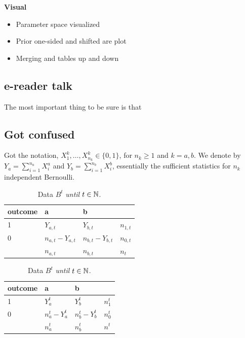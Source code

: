 \textbf{Visual}
\begin{itemize}
	\item Parameter space visualized
	\item Prior one-sided and shifted are plot
	\item Merging and tables up and down
\end{itemize}

\subsection*{e-reader talk}

The most important thing to be sure is that


\subsection*{Got confused}

Got the notation, $X_1^k, \ldots, X_{n_k}^k\in \{0,1\}$, for $n_k\geq 1$ and $k=a,b$. We denote by $Y_{a}=\sum_{i=1}^{n_a} X_i^a$ and $Y_{b}=\sum_{i=1}^{n_b} X_i^b$, essentially the sufficient statistics for $n_k$ independent Bernoulli.

\begin{table}[h]
	\centering
	\begin{minipage}{0.45\textwidth}
		\centering
		\begin{tabular}{llll}
			\toprule
			outcome & a                  & b                               \\
			\midrule
			1       & $Y_{a,t}$          & $Y_{b,t}$          & $n_{1,t} $ \\
			0       & $n_{a,t}- Y_{a,t}$ & $n_{b,t}- Y_{b,t}$ & $n_{0,t}$  \\
			        & $n_{a,t}$          & $n_{b,t}$          & $n_t$      \\
			\bottomrule
		\end{tabular}
		\caption{Data $B_t$ \emph{at} $t\in \mathbb{N}$.} \label{table:2x2_at_t}
	\end{minipage}
	\hfill
	\begin{minipage}{0.45\textwidth}
		\centering
		\begin{tabular}{llll}
			\toprule
			outcome & a                 & b                             \\
			\midrule
			1       & $Y_{a}^t$         & $Y_{b}^t$         & $n_1^t$   \\
			0       & $n_a^t - Y_{a}^t$ & $n_b^t - Y_{b}^t$ & $n_0^{t}$ \\
			        & $n_a^{t}$         & $n_b^{t}$         & $n^{t}$   \\
			\bottomrule
		\end{tabular}
		\caption{Data $B^t$ \emph{until} $t\in \mathbb{N}$.} \label{table:2x2_until_t}
	\end{minipage}
\end{table}


